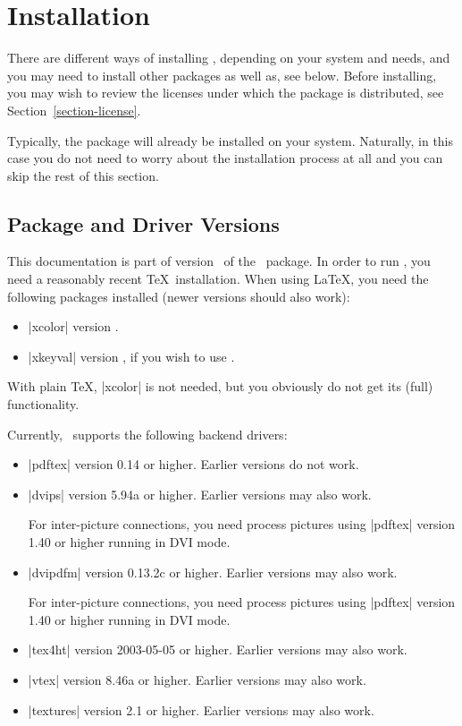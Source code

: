 %
%
%

\section{Installation}

There are different ways of installing \pgfname, depending
on your system and needs, and you may need to install other
packages as well as, see below. Before installing, you may wish to
review the licenses under which the package is
distributed, see Section~\ref{section-license}. 

Typically, the package will already be installed on your
system. Naturally, in this case you do not need to worry about the
installation process at all and you can skip the rest of this
section. 


\subsection{Package and Driver Versions}

This documentation is part of version \pgfversion\ of the \pgfname\
package. In order to run \pgfname, you need a reasonably recent 
\TeX\ installation. When using \LaTeX, you need the following packages
installed (newer versions should also work):
\begin{itemize}
\item
  |xcolor| version \xcolorversion.
\item
  |xkeyval| version \xkeyvalversion, if you wish to use \tikzname.
\end{itemize}
With plain \TeX, |xcolor| is not needed, but you obviously do not
get its (full) functionality. 

Currently, \pgfname\ supports the following backend drivers:
\begin{itemize}
\item
  |pdftex| version 0.14 or higher. Earlier versions do not work.
\item
  |dvips| version 5.94a or higher. Earlier versions may also work.

  For inter-picture connections, you need process pictures using
  |pdftex| version 1.40 or higher running in DVI mode.
\item
  |dvipdfm| version 0.13.2c or higher. Earlier versions may also work.

  For inter-picture connections, you need process pictures using
  |pdftex| version 1.40 or higher running in DVI mode.
\item
  |tex4ht| version 2003-05-05 or higher. Earlier versions may also work.
\item
  |vtex| version 8.46a or higher. Earlier versions may also work.
\item
  |textures| version 2.1 or higher. Earlier versions may also work.
\end{itemize}

